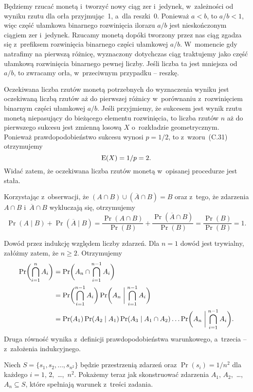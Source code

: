 \exercise{} %
Będziemy rzucać monetą i~tworzyć nowy ciąg zer i~jedynek, w~zależności od wyniku rzutu dla orła przyjmując~1, a~dla reszki~0. Ponieważ $a<b$, to $a/b<1$, więc część ułamkowa binarnego rozwinięcia ilorazu $a/b$ jest nieskończonym ciągiem zer i~jedynek. Rzucamy monetą dopóki tworzony przez nas ciąg zgadza się z~prefiksem rozwinięcia binarnego części ułamkowej $a/b$. W~momencie gdy natrafimy na pierwszą różnicę, wyznaczony dotychczas ciąg traktujemy jako część ułamkową rozwinięcia binarnego pewnej liczby. Jeśli liczba ta jest mniejsza od $a/b$, to zwracamy orła, w~przeciwnym przypadku -- reszkę.

Oczekiwana liczba rzutów monetą potrzebnych do wyznaczenia wyniku jest oczekiwaną liczbą rzutów aż do pierwszej różnicy w~porównaniu z~rozwinięciem binarnym części ułamkowej $a/b$. Jeśli przyjmiemy, że sukcesem jest wynik rzutu monetą niepasujący do bieżącego elementu rozwinięcia, to liczba rzutów $n$ aż do pierwszego sukcesu jest zmienną losową $X$ o~rozkładzie geometrycznym. Ponieważ prawdopodobieństwo sukcesu wynosi $p=1/2$, to z~wzoru~(C.31) otrzymujemy
\[
	\operatorname{E}(X) = 1/p = 2.
\]
Widać zatem, że oczekiwana liczba rzutów monetą w~opisanej procedurze jest stała.

\exercise{} %
Korzystając z~obserwacji, że $(A\cap B)\cup(\overline{A}\cap B)=B$ oraz z~tego, że zdarzenia $A\cap B$ i~$\overline{A}\cap B$ wykluczają się, otrzymujemy
\[
	\Pr(A\mid B)+\Pr(\overline{A}\mid B) = \frac{\Pr(A\cap B)}{\Pr(B)}+\frac{\Pr(\overline{A}\cap B)}{\Pr(B)} = \frac{\Pr(B)}{\Pr(B)} = 1.
\]

\exercise{} %
Dowód przez indukcję względem liczby zdarzeń. Dla $n=1$ dowód jest trywialny, załóżmy zatem, że $n\ge2$. Otrzymujemy
\begin{align*}
	\Pr\biggl(\bigcap_{i=1}^nA_i\biggr) &= \Pr\biggl(A_n\cap\bigcap_{i=1}^{n-1}A_i\biggr) \\
	&= \Pr\biggl(\bigcap_{i=1}^{n-1}A_i\biggr)\Pr\biggl(A_n\biggm|\bigcap_{i=1}^{n-1}A_i\biggr) \\
	&= \Pr(A_1)\Pr(A_2\mid A_1)\Pr(A_3\mid A_1\cap A_2)\dots\Pr\biggl(A_n\biggm|\bigcap_{i=1}^{n-1}A_i\biggr).
\end{align*}
Druga równość wynika z~definicji prawdopodobieństwa warunkowego, a~trzecia -- z~założenia indukcyjnego.

\exercise{} %
Niech $S=\{s_1,s_2,\dots,s_{n^2}\}$ będzie przestrzenią zdarzeń oraz $\Pr(s_i)=1/n^2$ dla każdego $i=1$, 2,~\dots,~$n^2$. Pokażemy teraz jak skonstruować zdarzenia $A_1$, $A_2$,~\dots,~$A_n\subseteq S$, które spełniają warunek z~treści zadania.

